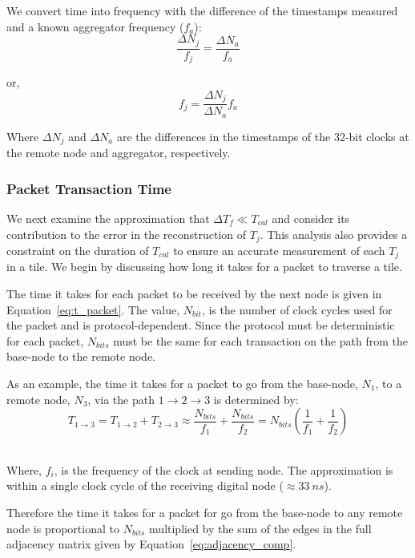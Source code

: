 We convert time into frequency with the difference of the timestamps measured and a known aggregator frequency ($f_{a}$):
\begin{equation}
   \frac{\Delta N_{j}}{f_{j}} = \frac{\Delta N_{a}}{f_{a}}
\end{equation}

or,
\begin{equation}
   \boxed{f_{j} = \frac{\Delta N_{j}}{\Delta N_{a}}f_{a}}
\end{equation}

Where $\Delta N_{j}$ and $\Delta N_{a}$ are the differences in the timestamps of the 32-bit clocks at the remote node and aggregator, respectively.


\subsubsection{Packet Transaction Time}

 We next examine the approximation that $\Delta T_{f} \ll T_{cal}$ and consider its contribution to the error in the reconstruction of $T_{j}$.
This analysis also provides a constraint on the duration of $T_{cal}$ to ensure an accurate measurement of each $T_{j}$ in a tile.
We begin by discussing how long it takes for a packet to traverse a tile.

The time it takes for each packet to be received by the next node is given in Equation~\ref{eq:t_packet}.
The value, $N_{bit}$, is the number of clock cycles used for the packet and is protocol-dependent.
Since the protocol must be deterministic for each packet, $N_{bits}$ must be the same for each transaction on the path from the base-node to the remote node.

As an example, the time it takes for a packet to go from the base-node, $N_{1}$, to a remote node, $N_{3}$, via the path $1\rightarrow 2 \rightarrow 3$ is determined by:
\begin{equation}
  T_{1\rightarrow 3} = T_{1\rightarrow 2} + T_{2\rightarrow 3} \approx \frac{N_{bits}}{f_{1}} + \frac{N_{bits}}{f_{2}} = N_{bits}(\frac{1}{f_{1}} + \frac{1}{f_{2}})
\end{equation}~\label{eq:t_packetTransfer}

Where, $f_{i}$, is the frequency of the clock at sending node. The approximation is within a single clock cycle of the receiving digital node ($\approx 33~\unit{ns}$).

Therefore the time it takes for a packet for go from the base-node to any remote node is proportional to $N_{bits}$ multiplied by the sum of the edges in the full adjacency matrix given by Equation~\ref{eq:adjacency_comp}.

